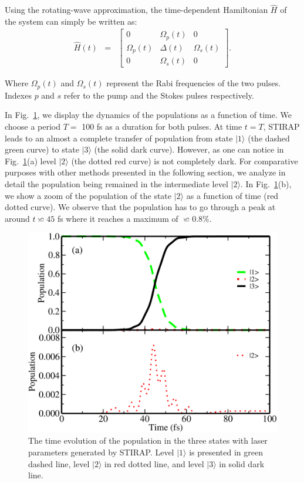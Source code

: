 \documentclass[]{interact}
\theoremstyle{plain}%
\theoremstyle{definition}
\theoremstyle{remark}
\begin{document}
Using the rotating-wave approximation, the time-dependent Hamiltonian 
$\hat{H}$ of the system can simply be written as:
\begin{eqnarray}
     \hat{H}(t) &=& 
 \begin{bmatrix}
        0 &  \Omega_p(t) &  0 \\
       \Omega_p(t) & \Delta(t) & \Omega_s(t) \\
       0 &  \Omega_s(t) &  0 
 \end{bmatrix}.
 \label{eq:Ham1}
\end{eqnarray}

Where $\Omega_p(t)$ and $\Omega_s(t)$ represent the Rabi frequencies of 
the two pulses. Indexes $p$ and $s$ refer to the pump and the 
Stokes pulses respectively. 

In Fig.~\ref{fig:Populations-STIRAP}, we display the dynamics of the 
populations as a function of time. We choose a period $T=$ 100 fs as a 
duration for both pulses. 
At time $t=T$,  STIRAP leads to an almost a complete 
transfer of population from state $|1\rangle$ (the dashed green curve) to state 
$|3\rangle$ (the solid dark curve). However, as one can notice 
in Fig.~\ref{fig:Populations-STIRAP}(a) level $|2\rangle$  (the dotted red 
curve) is not completely dark. 
For comparative purposes with other methods presented in the following section, 
we analyze in detail the population being remained in the intermediate level 
$|2\rangle$.  In Fig.~\ref{fig:Populations-STIRAP}(b), we show a zoom of the 
population of the state $|2\rangle$ as a function of time (red dotted curve). 
We observe that the population has to go through a peak at around $t\backsimeq 
45$ fs where it reaches a maximum of $\backsimeq0.8\%$. 
\begin{figure}[h!]
\centering
\includegraphics[width=0.7\linewidth]{Figure2}
\caption{The time evolution of the population in the three states with laser 
parameters generated by STIRAP. Level $|1\rangle$ is presented in green dashed 
line, level $|2\rangle$ in red dotted line, and level $|3\rangle$ in solid dark 
line. \label{fig:Populations-STIRAP}}
\end{figure}
\end{document}
